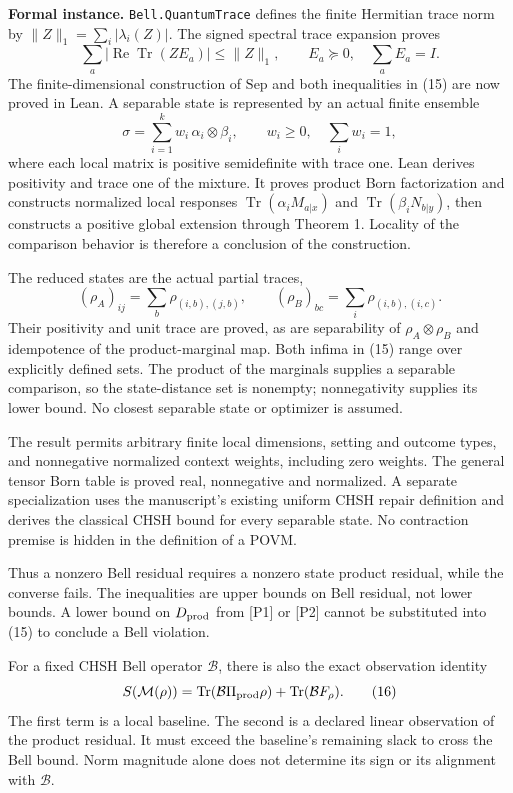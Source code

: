\documentclass[
]{article}
\begin{document}
\textbf{Formal instance.} \texttt{Bell.QuantumTrace} defines the finite Hermitian trace norm by \(\|Z\|_1=\sum_i|\lambda_i(Z)|\). The signed spectral trace expansion proves
\[
\sum_a|\operatorname{Re}\operatorname{Tr}(ZE_a)|\le\|Z\|_1,
\qquad E_a\succeq0,\quad\sum_aE_a=I.
\]
The finite-dimensional construction of \(\mathrm{Sep}\) and both inequalities in (15) are now proved in Lean. A separable state is represented by an actual finite ensemble
\[
\sigma=\sum_{i=1}^{k} w_i\,\alpha_i\otimes\beta_i,
\qquad w_i\ge0,\quad\sum_iw_i=1,
\]
where each local matrix is positive semidefinite with trace one. Lean derives positivity and trace one of the mixture. It proves product Born factorization and constructs normalized local responses \(\operatorname{Tr}(\alpha_iM_{a|x})\) and \(\operatorname{Tr}(\beta_iN_{b|y})\), then constructs a positive global extension through Theorem 1. Locality of the comparison behavior is therefore a conclusion of the construction.

The reduced states are the actual partial traces,
\[
(\rho_A)_{ij}=\sum_b\rho_{(i,b),(j,b)},
\qquad (\rho_B)_{bc}=\sum_i\rho_{(i,b),(i,c)}.
\]
Their positivity and unit trace are proved, as are separability of \(\rho_A\otimes\rho_B\) and idempotence of the product-marginal map. Both infima in (15) range over explicitly defined sets. The product of the marginals supplies a separable comparison, so the state-distance set is nonempty; nonnegativity supplies its lower bound. No closest separable state or optimizer is assumed.

The result permits arbitrary finite local dimensions, setting and outcome types, and nonnegative normalized context weights, including zero weights. The general tensor Born table is proved real, nonnegative and normalized. A separate specialization uses the manuscript's existing uniform CHSH repair definition and derives the classical CHSH bound for every separable state. No contraction premise is hidden in the definition of a POVM.

Thus a nonzero Bell residual requires a nonzero state product residual, while the converse fails. The inequalities are upper bounds on Bell residual, not lower bounds. A lower bound on \(D_{\rm prod}\) from {[}P1{]} or {[}P2{]} cannot be substituted into (15) to conclude a Bell violation.

For a fixed CHSH Bell operator \(\mathcal B\), there is also the exact observation identity
\[
S(\mathcal M(\rho))
=\operatorname{Tr}(\mathcal B\Pi_{\rm prod}\rho)
 +\operatorname{Tr}(\mathcal B F_\rho).
\tag{16}
\]
The first term is a local baseline. The second is a declared linear observation of the product residual. It must exceed the baseline's remaining slack to cross the Bell bound. Norm magnitude alone does not determine its sign or its alignment with \(\mathcal B\).
\end{document}
